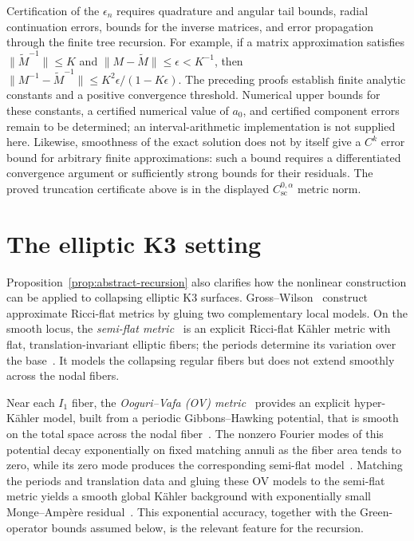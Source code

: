 \documentclass[11pt,a4paper,twoside]{article}
\numberwithin{equation}{section}
\theoremstyle{definition}
\theoremstyle{remark}
\begin{document}
Certification of the \(\epsilon_n\) requires quadrature and angular
tail bounds, radial continuation errors, bounds for the inverse
matrices, and error propagation through the finite tree recursion.
For example, if a matrix approximation satisfies
\(\|\widetilde M^{-1}\|\le K\) and
\(\|M-\widetilde M\|\le\epsilon<K^{-1}\), then
\(\|M^{-1}-\widetilde M^{-1}\|
\le K^2\epsilon/(1-K\epsilon)\).
The preceding proofs establish finite analytic constants and a positive
convergence threshold. Numerical upper bounds for these constants, a
certified numerical value of \(a_0\), and certified component errors
remain to be determined; an interval-arithmetic implementation is not
supplied here. Likewise, smoothness of the exact
solution does not by itself give a \(C^k\) error bound for arbitrary
finite approximations: such a bound requires a differentiated
convergence argument or sufficiently strong bounds for their residuals.
The proved truncation certificate above is in the displayed
\(C_{\mathrm{sc}}^{0,\alpha}\) metric norm.

\section{The elliptic K3 setting}
\label{sec:elliptic-outlook}
Proposition~\ref{prop:abstract-recursion} also clarifies how the
nonlinear construction can be applied to collapsing elliptic K3
surfaces.
Gross--Wilson~\cite{GrossWilson} construct approximate Ricci-flat
metrics by gluing two complementary local models. On the smooth
locus, the \emph{semi-flat metric}~\cite{GreeneShapereVafaYau1990}
is an explicit Ricci-flat K\"ahler metric with flat,
translation-invariant elliptic fibers; the periods determine its
variation over the base~\cite[Example~2.2]{GrossWilson}.
It models the collapsing regular fibers but does not extend
smoothly across the nodal fibers.

Near each \(I_1\) fiber, the \emph{Ooguri--Vafa (OV)
metric}~\cite{OoguriVafa1996} provides an explicit hyper-K\"ahler
model, built from a periodic Gibbons--Hawking potential, that is
smooth on the total space across the nodal
fiber~\cite[Section~3]{GrossWilson}. The nonzero Fourier modes
of this potential decay exponentially on fixed matching annuli
as the fiber area tends to zero, while its zero mode produces the corresponding
semi-flat model~\cite[Lemma~3.1]{GrossWilson}.
Matching the periods and translation data and gluing these OV
models to the semi-flat metric yields a smooth
global K\"ahler background with exponentially small
Monge--Amp\`ere residual~\cite[Theorem~4.5]{GrossWilson}.
This exponential accuracy, together with the Green-operator
bounds assumed below, is the relevant feature for the recursion.
\end{document}
